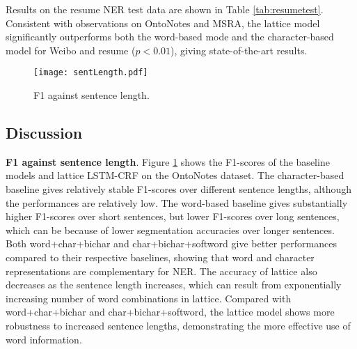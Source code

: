 \documentclass[11pt,a4paper]{article}
\begin{document}
\begin{CJK*}{UTF8}{gbsn}
Results on the resume NER test data are shown in Table \ref{tab:resumetest}. Consistent with observations on OntoNotes and MSRA, the lattice model significantly outperforms both the word-based mode and the character-based model for Weibo and resume ($p<0.01$), giving state-of-the-art results.
 



\begin{table}[!tp]
\begin{center}
\end{center}
\caption{Main results on resume NER.}
\label{tab:resumetest}
\end{table}

\begin{figure}[!tp] 
  \centering 
  \texttt{[image: sentLength.pdf]}
  \vspace*{-5mm}
  \caption{F1 against sentence length.}
  \label{fig:sentLength}
\end{figure}


\subsection{Discussion}
\noindent \textbf{F1 against sentence length}. Figure \ref{fig:sentLength} shows the F1-scores of the baseline models and lattice LSTM-CRF on the OntoNotes dataset. The character-based baseline gives relatively stable F1-scores over different sentence lengths, although the performances are relatively low. The word-based baseline gives substantially higher F1-scores over short sentences, but lower F1-scores over long sentences, which can be because of lower segmentation accuracies over longer sentences. Both word+char+bichar and char+bichar+softword give better performances compared to their respective baselines, showing that word and character representations are complementary for NER. The accuracy of lattice also decreases as the sentence length increases, which can result from exponentially increasing number of word combinations in lattice. Compared with word+char+bichar and char+bichar+softword, the lattice model shows more robustness to increased sentence lengths, demonstrating the more effective use of word information. 


\end{CJK*}
\end{document}
